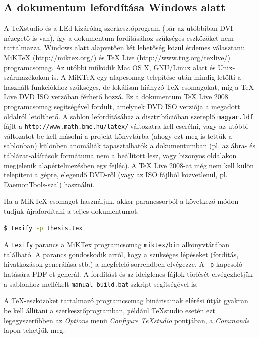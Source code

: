 \subsection{A dokumentum lefordítása Windows alatt}
A TeXstudio és a LEd kizárólag szerkesztőprogram (bár az utóbbiban DVI-nézegető is van), így a dokumentum fordításához szükséges eszközöket nem tartalmazza. Windows alatt alapvetően két lehetőség közül érdemes választani: MiKTeX (\url{http://miktex.org/}) és TeX Live (\url{http://www.tug.org/texlive/}) programcsomag. Az utóbbi működik Mac OS X, GNU/Linux alatt és Unix-származékokon is. A MiKTeX egy alapcsomag telepítése után mindig letölti a használt funkciókhoz szükséges, de lokálisan hiányzó \TeX-csomagokat, míg a TeX Live DVD ISO verzóban férhető hozzá. Ez a dokumentum TeX Live 2008 programcsomag segítségével fordult, amelynek DVD ISO verziója a megadott oldalról letölthető. A sablon lefordításához a disztribúcióban szereplő \verb+magyar.ldf+ fájlt a \verb+http://www.math.bme.hu/latex/+ változatra kell cserélni, vagy az utóbbi változatot be kell másolni a projekt-könyvtárba (ahogy ezt meg is tettük a sablonban) különben anomáliák tapasztalhatók a dokumentumban (pl. az ábra- és táblázat-aláírások formátuma nem a beállított lesz, vagy bizonyos oldalakon megjelenik alapértelmezésben egy fejléc). A TeX Live 2008-at még nem kell külön telepíteni a gépre, elegendő DVD-ről (vagy az ISO fájlból közvetlenül, pl. DaemonTools-szal) használni.

Ha a MiKTeX csomagot használjuk, akkor parancssorból a következő módon tudjuk újrafordítani a teljes dokumentumot:

\begin{lstlisting}[language=bash,frame=single,float=!ht]
$ texify -p thesis.tex
\end{lstlisting}

A \verb+texify+ parancs a MiKTex programcsomag \verb+miktex/bin+ alkönyvtárában található. A parancs gondoskodik arról, hogy a szükséges lépéseket (fordítás, hivatkozások generálása stb.) a megfelelő sorrendben elvégezze. A \verb+-p+ kapcsoló hatására PDF-et generál. A fordítást és az ideiglenes fájlok törlését elvégezhetjük a sablonhoz mellékelt \verb+manual_build.bat+ szkript segítségével is.

A \TeX-eszközöket tartalmazó programcsomag binárisainak elérési útját gyakran be kell állítani a szerkesztőprogramban, például TeXstudio esetén ezt legegyszerűbben az \emph{Options} menü \emph{Configure TeXstudio} pontjában, a \emph{Commands} lapon tehetjük meg.

